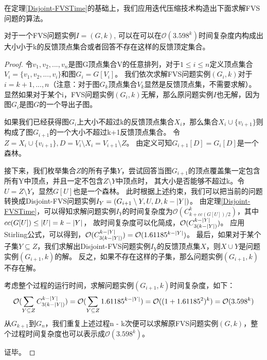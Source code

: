 在定理\ref{Disjoint-FVSTime}的基础上，我们应用迭代压缩技术构造出下面求解FVS问题的算法。
\begin{theorem}
对于一个FVS问题实例$I = (G, k)$, 可以在可以在$\mathcal{O}(3.598^k)$时间复杂度内构成出大小小于k的反馈顶点集合或者回答不存在这样的反馈顶定集合。
\end{theorem}
\begin{proof}
令$v_1, v_2, ..., v_n$是图G顶点集合V的任意排列，对于$1 \le i \le n$定义顶点集合$V_i = \{v_1, v_2, ..., v_i\}$和图$G_i = G[V_i]$。
我们依次求解FVS问题实例$(G_i, k)$对于$i = k+1, ..., n$（注意：对于图$G_k$顶点集合$V_k$显然是反馈顶点集，不需要求解）。
显然如果对于某个i，FVS问题实例$(G_i, k)$无解，那么原问题实例$I$也无解，因为图$G_i$是图$G$的一个导出子图。

如果我们已经获得图$G_i$上大小不超过k的反馈顶点集合$X_i$，那么集合$X_i \cup \{v_{i+1}\}$则构成了图$G_{i+1}$的一个大小不超过k+1反馈顶点集合。
令$Z = X_i \cup \{v_{i+1}\}, D = V_i \setminus X_i = V_{i+1} \setminus Z$。
由定义可知$G_{i+1}[D] = G_i[D]$是一个森林。

接下来，我们枚举集合$Z$的所有子集$Y$，尝试回答当图$G_{i+1}$的顶点覆盖集一定包含所有Y中顶点，并且一定不包含$Z \setminus Y$中顶点时，
其大小是否能够不超过k。令$U = Z \setminus Y$，显然$G[U]$也是一个森林。
此时根据上述约束，我们可以把当前的问题转换成Disjoint-FVS问题实例$I_Y = (G_{i+1} \setminus Y, U, D, k-\left\vert Y \right\vert)$。
由定理\ref{Disjoint-FVSTime}，可以得知求解问题实例$I_Y$的时间复杂度为$\mathcal{O}(C^k_{k + cc(G[U])/2})$，其中$cc(G[U]) \le \left\vert U \right\vert = k - \left\vert Y \right\vert$，
故时间复杂度可以化简成，$\mathcal{O}(C^{k - \left\vert Y \right\vert}_{3(k - \left\vert Y \right\vert)})$。
应用Stirling公式，可以得到，$\mathcal{O}(C^{k - \left\vert Y \right\vert}_{3(k - \left\vert Y \right\vert)}) = \mathcal{O}(1.61185^{k - \left\vert Y \right\vert})$。
最后，如果对于某个子集$Y \subseteq Z$，我们求解出Disjoint-FVS问题实例$I_Y$的反馈顶点集$X$，则$X \cup Y$是问题实例$(G_{i+1}, k)$的解。
反之，如果不存在这样的子集，那么问题实例$(G_{i+1}, k)$不存在解。

考虑整个过程的运行时间，求解问题实例$(G_{i+1}, k)$时间复杂度，如下：
\begin{equation*}
  \mathcal{O}(\sum_{Y \subseteq Z}C^{k - \left\vert Y \right\vert}_{3(k - \left\vert Y \right\vert)}) \\
   = \mathcal{O}(\sum_{Y \subseteq Z}1.61185^{k - \left\vert Y \right\vert})
   = \mathcal{O}((1 + 1.61185^2)^k) = \mathcal{O}(3.598^k)
\end{equation*}
从$G_{k+1}$到$G_n$，我们重复上述过程n - k次便可以求解原FVS问题实例$(G, k)$，整个过程时间复杂度也可以表示成$\mathcal{O}(3.598^k)$。

证毕。
\end{proof}
